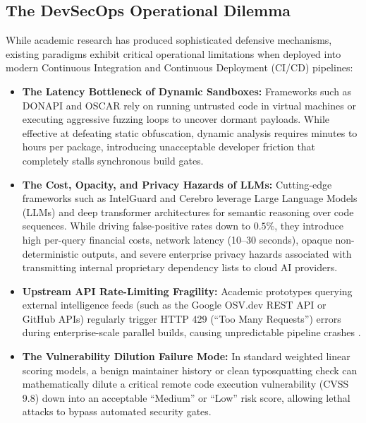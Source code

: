 \subsection{The DevSecOps Operational Dilemma}
While academic research has produced sophisticated defensive mechanisms, existing paradigms exhibit critical operational limitations when deployed into modern Continuous Integration and Continuous Deployment (CI/CD) pipelines:
\begin{itemize}
    \item \textbf{The Latency Bottleneck of Dynamic Sandboxes:} Frameworks such as DONAPI \cite{huang2024donapi} and OSCAR \cite{duan2024oscar} rely on running untrusted code in virtual machines or executing aggressive fuzzing loops to uncover dormant payloads. While effective at defeating static obfuscation, dynamic analysis requires minutes to hours per package, introducing unacceptable developer friction that completely stalls synchronous build gates.
    \item \textbf{The Cost, Opacity, and Privacy Hazards of LLMs:} Cutting-edge frameworks such as IntelGuard \cite{guo2026intelguard} and Cerebro \cite{zhang2025cerebro} leverage Large Language Models (LLMs) and deep transformer architectures for semantic reasoning over code sequences. While driving false-positive rates down to $0.5\%$, they introduce high per-query financial costs, network latency (10--30 seconds), opaque non-deterministic outputs, and severe enterprise privacy hazards associated with transmitting internal proprietary dependency lists to cloud AI providers.
    \item \textbf{Upstream API Rate-Limiting Fragility:} Academic prototypes querying external intelligence feeds (such as the Google OSV.dev REST API \cite{osv2024database} or GitHub APIs) regularly trigger HTTP 429 (``Too Many Requests'') errors during enterprise-scale parallel builds, causing unpredictable pipeline crashes \cite{jiang2025sbom}.
    \item \textbf{The Vulnerability Dilution Failure Mode:} In standard weighted linear scoring models, a benign maintainer history or clean typosquatting check can mathematically dilute a critical remote code execution vulnerability (CVSS 9.8) down into an acceptable ``Medium'' or ``Low'' risk score, allowing lethal attacks to bypass automated security gates.
\end{itemize}

